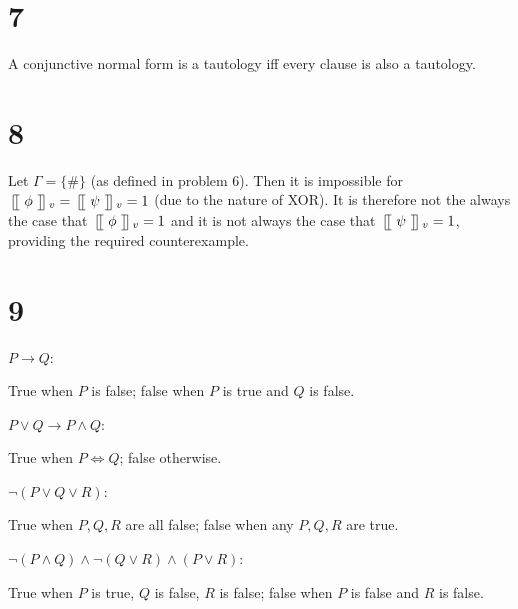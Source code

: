 \documentclass[10pt]{article}
\newcommand{\llbracket}{\
  \begin{tikzpicture}[scale=0.09,baseline=.3em]
  \draw (1.75,0) -- (0,0) -- (0,4) -- (1.75,4);
  \draw (1,0) -- (1,4);
  \end{tikzpicture}
  \
}
\newcommand{\rrbracket}{\
  \begin{tikzpicture}[scale=0.09,baseline=.3em]
  \draw (0,4) -- (1.75,4) -- (1.75,0) -- (0,0);
  \draw (.75,0) -- (.75,4);
  \end{tikzpicture}
  \
}
\begin{document}

\section*{7}
A conjunctive normal form is a tautology iff every clause is also a tautology.


\section*{8}
Let $\Gamma = \{ \# \}$ (as defined in problem 6). Then it is impossible for $\llbracket \phi \rrbracket _v = \llbracket \psi \rrbracket _v = 1$ (due to the nature of XOR). It is therefore not the always the case that $\llbracket \phi \rrbracket _v = 1$ and it is not always the case that $\llbracket \psi \rrbracket _v = 1$, providing the required counterexample.


\section*{9}
\begin{description*}
  \item[$P\to Q$:] 

  True when $P$ is false; false when $P$ is true and $Q$ is false.

  \item[$P \lor Q \to P \land Q$:]

  True when $P\iff Q$; false otherwise.

  \item[$\lnot (P \lor Q \lor R)$:]

  True when $P,Q,R$ are all false; false when any $P,Q,R$ are true.

  \item[$\lnot (P \land Q) \land \lnot (Q \lor R) \land (P\lor R)$:]

  True when $P$ is true, $Q$ is false, $R$ is false; false when $P$ is false and $R$ is false.


\end{description*}
\end{document}

